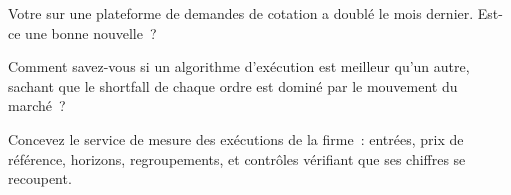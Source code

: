 \begin{interviewq}\label{iq:rs:measuring-market-making-and-execution:4}
Votre  sur une plateforme de demandes de cotation a doublé le mois dernier. Est-ce une bonne nouvelle~?
\end{interviewq}

\begin{interviewq}\label{iq:rs:measuring-market-making-and-execution:5}
Comment savez-vous si un algorithme d'exécution est meilleur qu'un autre, sachant que le shortfall de chaque ordre est dominé par le mouvement du marché~?
\end{interviewq}

\begin{interviewq}\label{iq:rs:measuring-market-making-and-execution:6}
Concevez le service de mesure des exécutions de la firme~: entrées, prix de référence, horizons, regroupements, et contrôles vérifiant que ses chiffres se recoupent.
\end{interviewq}

